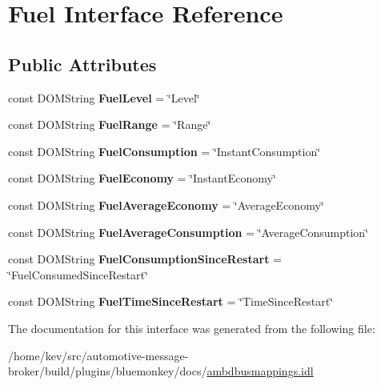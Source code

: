 \hypertarget{interfaceFuel}{\section{Fuel Interface Reference}
\label{interfaceFuel}
}
\subsection*{Public Attributes}
\begin{DoxyCompactItemize}
\item 
\hypertarget{interfaceFuel_a66d804618123a714025400d77e9e0a91}{const D\+O\+M\+String {\bfseries Fuel\+Level} = \char`\"{}Level\char`\"{}}\label{interfaceFuel_a66d804618123a714025400d77e9e0a91}

\item 
\hypertarget{interfaceFuel_ad587a4868bd4a0bd757bcc816ecf9b8e}{const D\+O\+M\+String {\bfseries Fuel\+Range} = \char`\"{}Range\char`\"{}}\label{interfaceFuel_ad587a4868bd4a0bd757bcc816ecf9b8e}

\item 
\hypertarget{interfaceFuel_ab55c40fa9eac6d92afb34d12bafb155c}{const D\+O\+M\+String {\bfseries Fuel\+Consumption} = \char`\"{}Instant\+Consumption\char`\"{}}\label{interfaceFuel_ab55c40fa9eac6d92afb34d12bafb155c}

\item 
\hypertarget{interfaceFuel_a2f89e032fc01b5350ff78ef92b35d869}{const D\+O\+M\+String {\bfseries Fuel\+Economy} = \char`\"{}Instant\+Economy\char`\"{}}\label{interfaceFuel_a2f89e032fc01b5350ff78ef92b35d869}

\item 
\hypertarget{interfaceFuel_a10a854ac1c73a8796a510c69da92f7b6}{const D\+O\+M\+String {\bfseries Fuel\+Average\+Economy} = \char`\"{}Average\+Economy\char`\"{}}\label{interfaceFuel_a10a854ac1c73a8796a510c69da92f7b6}

\item 
\hypertarget{interfaceFuel_a38dcf97480a2db27c909dbd669cf985f}{const D\+O\+M\+String {\bfseries Fuel\+Average\+Consumption} = \char`\"{}Average\+Consumption\char`\"{}}\label{interfaceFuel_a38dcf97480a2db27c909dbd669cf985f}

\item 
\hypertarget{interfaceFuel_a6d1e861e2d57b75407f37591f907b213}{const D\+O\+M\+String {\bfseries Fuel\+Consumption\+Since\+Restart} = \char`\"{}Fuel\+Consumed\+Since\+Restart\char`\"{}}\label{interfaceFuel_a6d1e861e2d57b75407f37591f907b213}

\item 
\hypertarget{interfaceFuel_ab67ddc1003565005be77b218cd5218af}{const D\+O\+M\+String {\bfseries Fuel\+Time\+Since\+Restart} = \char`\"{}Time\+Since\+Restart\char`\"{}}\label{interfaceFuel_ab67ddc1003565005be77b218cd5218af}

\end{DoxyCompactItemize}


The documentation for this interface was generated from the following file\+:\begin{DoxyCompactItemize}
\item 
/home/kev/src/automotive-\/message-\/broker/build/plugins/bluemonkey/docs/\hyperlink{ambdbusmappings_8idl}{ambdbusmappings.\+idl}\end{DoxyCompactItemize}
